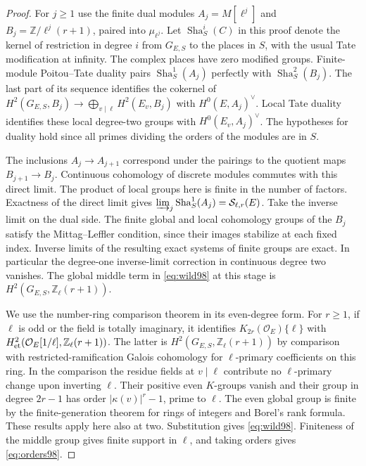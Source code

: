 \documentclass[a4paper,11pt]{article}
\theoremstyle{definition}
\theoremstyle{remark}
\newcommand{\ZZ}{\mathbb Z}\newcommand{\ord}{\operatorname{ord}}
\numberwithin{equation}{section}
\newcommand{\Sel}{\mathcal S}
\newcommand{\OO}{\mathcal O}
\begin{document}
\begin{proof}
For \(j\ge1\) use the finite dual modules
\(A_j=M[\ell^j]\) and \(B_j=\ZZ/\ell^j(r+1)\), paired into
\(\mu_{\ell^j}\). Let \(\operatorname{Sha}^i_S(C)\) in this proof denote the
kernel of restriction in degree \(i\) from \(G_{E,S}\) to the
places in \(S\), with the usual Tate modification at infinity.
The complex places have zero modified groups. Finite-module
Poitou--Tate duality pairs \(\operatorname{Sha}^1_S(A_j)\) perfectly with
\(\operatorname{Sha}^2_S(B_j)\). The last part of its sequence identifies the
cokernel of \(H^2(G_{E,S},B_j)\to\bigoplus_{v\mid\ell}H^2(E_v,B_j)\)
with \(H^0(E,A_j)^\vee\). Local Tate duality identifies these
local degree-two groups with \(H^0(E_v,A_j)^\vee\).
The hypotheses for duality hold since all primes dividing the
orders of the modules are in \(S\).~\cite[I, Cor.~2.3 and Thm.~4.10]{V-III-V-milne98}

The inclusions \(A_j\to A_{j+1}\) correspond under the pairings
to the quotient maps \(B_{j+1}\to B_j\). Continuous cohomology of
discrete modules commutes with this direct limit. The product
of local groups here is finite in the number of factors.
Exactness of the direct limit gives
\(\varinjlim_j\operatorname{Sha}^1_S(A_j)=\Sel_{\ell,r}(E)\).
Take the inverse limit on the dual side. The finite global and
local cohomology groups of the \(B_j\) satisfy the Mittag--Leffler
condition, since their images stabilize at each fixed index.
Inverse limits of the resulting exact systems of finite groups
are exact. In particular the degree-one inverse-limit correction
in continuous degree two vanishes. The global middle term in
\eqref{eq:wild98} at this stage is
\(H^2(G_{E,S},\ZZ_\ell(r+1))\).

We use the number-ring comparison theorem in its even-degree
form. For \(r\ge1\), if \(\ell\) is odd or the field is totally
imaginary, it identifies \(K_{2r}(\OO_E)\{\ell\}\) with
\(H^2_{\rm et}(\OO_E[1/\ell],\ZZ_\ell(r+1))\).
The latter is \(H^2(G_{E,S},\ZZ_\ell(r+1))\) by comparison with
restricted-ramification Galois cohomology for \(\ell\)-primary
coefficients on this ring. In the comparison the residue fields
at \(v\mid\ell\) contribute no \(\ell\)-primary change upon
inverting \(\ell\). Their positive even \(K\)-groups vanish and
their group in degree \(2r-1\) has order \(|\kappa(v)|^r-1\),
prime to \(\ell\). The even global group is finite by the
finite-generation theorem for rings of integers and Borel's rank
formula.~\cite[Ch.~VI, Thms.~8.2 and 8.4]{V-III-V-weibel98}
These results apply here also at two. Substitution gives
\eqref{eq:wild98}. Finiteness of the middle group gives finite
support in \(\ell\), and taking orders gives \eqref{eq:orders98}.
\end{proof}
\end{document}
